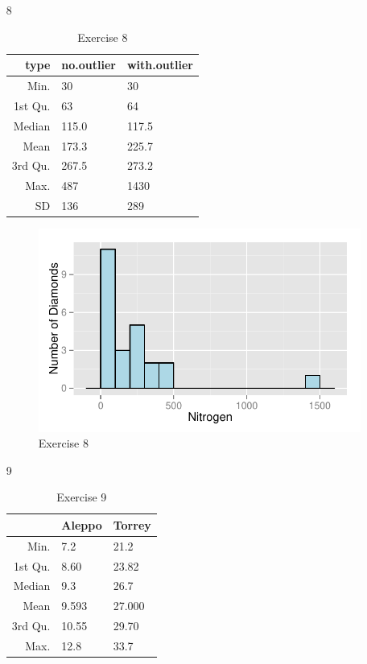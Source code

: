 \documentclass[letterpaper, landscape]{exam}
\begin{document}
\begin{enumerate}
    \item[8]
      \begin{table}[H]
        \centering
        \begin{tabular}{rll}
          \toprule
          type    & no.outlier & with.outlier \\
          \midrule
          Min.    & 30         & 30 \\
          1st Qu. & 63         & 64 \\
          Median  & 115.0      & 117.5 \\
          Mean    & 173.3      & 225.7 \\
          3rd Qu. & 267.5      & 273.2 \\
          Max.    & 487        & 1430 \\
          SD      & 136        & 289 \\
          \bottomrule
        \end{tabular}
        \caption{Exercise 8}
      \end{table}

      \begin{figure}[H]
        \centering
        \includegraphics[scale = 0.8]{figures/ex08.pdf}
        \caption{Exercise 8}
      \end{figure}

    \item[9]
      \begin{table}[H]
        \centering
        \begin{tabular}{rll}
          \toprule
                   & Aleppo & Torrey \\
          \midrule
          Min.     & 7.2    & 21.2 \\
          1st Qu.  & 8.60   & 23.82 \\
          Median   & 9.3    & 26.7 \\
          Mean     & 9.593  & 27.000 \\
          3rd Qu.  & 10.55  & 29.70 \\
          Max.     & 12.8   & 33.7 \\
          \bottomrule
        \end{tabular}
        \caption{Exercise 9}
      \end{table}


\end{enumerate}
\end{document}
